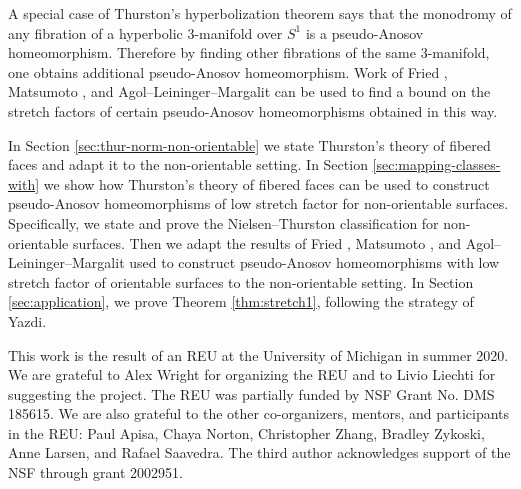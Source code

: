  A special case of Thurston's hyperbolization theorem says that the monodromy of any fibration of a hyperbolic 3-manifold over $S^1$ is a pseudo-Anosov homeomorphism.  Therefore by finding other fibrations of the same 3-manifold, one obtains additional pseudo-Anosov homeomorphism.  Work of Fried \cite{fried1982flow,fried1983transitive}, Matsumoto \cite{matsumoto1987topological}, and Agol--Leininger--Margalit \cite{agol6983pseudo} can be used to find a bound on the stretch factors of certain pseudo-Anosov homeomorphisms obtained in this way.


In Section \ref{sec:thur-norm-non-orientable} we state Thurston's theory of fibered faces and adapt it to the non-orientable setting.  In Section \ref{sec:mapping-classes-with} we show how Thurston's theory of fibered faces can be used to construct pseudo-Anosov homeomorphisms of low stretch factor for non-orientable surfaces.  Specifically, we state and prove the Nielsen--Thurston classification for non-orientable surfaces.  Then we adapt the results of Fried \cite{fried1982flow,fried1983transitive}, Matsumoto \cite{matsumoto1987topological}, and Agol--Leininger--Margalit \cite{agol6983pseudo} used to construct pseudo-Anosov homeomorphisms with low stretch factor of orientable surfaces to the non-orientable setting.  In Section \ref{sec:application}, we prove Theorem \ref{thm:stretch1}, following the strategy of Yazdi.

This work is the result of an REU at the University of Michigan in summer 2020.  We are grateful to Alex Wright for organizing the REU and to Livio Liechti for suggesting the project. The REU was partially funded by NSF Grant No. DMS 185615. We are also grateful to the other co-organizers, mentors, and participants in the REU: Paul Apisa, Chaya Norton, Christopher Zhang, Bradley Zykoski, Anne Larsen, and Rafael Saavedra.  The third author acknowledges support of the NSF through grant 2002951.


